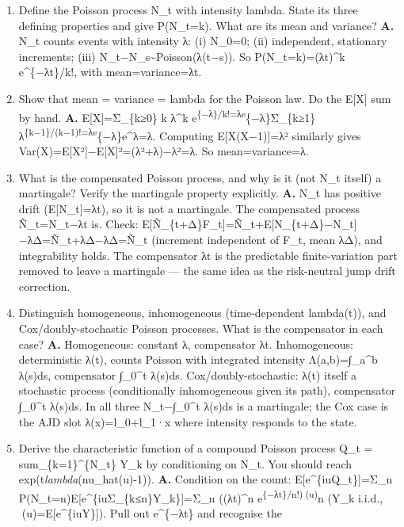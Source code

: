 \documentclass[
  11pt,
]{article}
\providecommand{\tightlist}{%
  \setlength{\itemsep}{0pt}\setlength{\parskip}{0pt}}
\begin{document}
\begin{enumerate}
\def\labelenumi{\arabic{enumi}.}
\tightlist
\item
  Define the Poisson process N\_t with intensity lambda. State its three
  defining properties and give P(N\_t=k). What are its mean and
  variance? \textbf{A.} N\_t counts events with intensity λ: (i) N\_0=0;
  (ii) independent, stationary increments; (iii)
  N\_t−N\_s\textasciitilde Poisson(λ(t−s)). So P(N\_t=k)=(λt)\^{}k
  e\^{}\{−λt\}/k!, with mean=variance=λt.
\item
  Show that mean = variance = lambda for the Poisson law. Do the
  E{[}X{]} sum by hand. \textbf{A.} E{[}X{]}=Σ\_\{k≥0\} k λ\^{}k
  e\textsuperscript{\{−λ\}/k!=λe}\{−λ\}Σ\_\{k≥1\}λ\textsuperscript{\{k−1\}/(k−1)!=λe}\{−λ\}e\^{}λ=λ.
  Computing E{[}X(X−1){]}=λ² similarly gives
  Var(X)=E{[}X²{]}−E{[}X{]}²=(λ²+λ)−λ²=λ. So mean=variance=λ.
\item
  What is the compensated Poisson process, and why is it (not N\_t
  itself) a martingale? Verify the martingale property explicitly.
  \textbf{A.} N\_t has positive drift (E{[}N\_t{]}=λt), so it is not a
  martingale. The compensated process Ñ\_t=N\_t−λt is. Check:
  E{[}Ñ\_\{t+Δ\}\textbar F\_t{]}=Ñ\_t+E{[}N\_\{t+Δ\}−N\_t{]}−λΔ=Ñ\_t+λΔ−λΔ=Ñ\_t
  (increment independent of F\_t, mean λΔ), and integrability holds. The
  compensator λt is the predictable finite-variation part removed to
  leave a martingale --- the same idea as the risk-neutral jump drift
  correction.
\item
  Distinguish homogeneous, inhomogeneous (time-dependent lambda(t)), and
  Cox/doubly-stochastic Poisson processes. What is the compensator in
  each case? \textbf{A.} Homogeneous: constant λ, compensator λt.
  Inhomogeneous: deterministic λ(t), counts Poisson with integrated
  intensity Λ(a,b)=∫\_a\^{}b λ(s)ds, compensator ∫\_0\^{}t λ(s)ds.
  Cox/doubly-stochastic: λ(t) itself a stochastic process (conditionally
  inhomogeneous given its path), compensator ∫\_0\^{}t λ(s)ds. In all
  three N\_t−∫\_0\^{}t λ(s)ds is a martingale; the Cox case is the AJD
  slot λ(x)=l\_0+l\_1·x where intensity responds to the state.
\item
  Derive the characteristic function of a compound Poisson process Q\_t
  = sum\_\{k=1\}\^{}\{N\_t\} Y\_k by conditioning on N\_t. You should
  reach exp(t\emph{lambda}(nu\_hat(u)-1)). \textbf{A.} Condition on the
  count: E{[}e\^{}\{iuQ\_t\}{]}=Σ\_n
  P(N\_t=n)E{[}e\^{}\{iuΣ\_\{k≤n\}Y\_k\}{]}=Σ\_n ((λt)\^{}n
  e\textsuperscript{\{−λt\}/n!)(u)}n (Y\_k i.i.d.,
  (u)=E{[}e\^{}\{iuY\}{]}). Pull out e\^{}\{−λt\} and recognise the

\end{enumerate}
\end{document}
